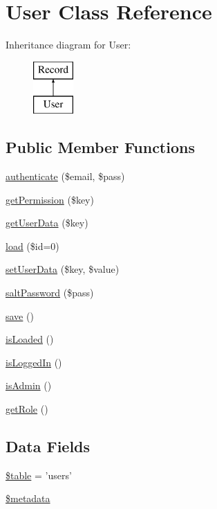 \hypertarget{class_user}{\section{User Class Reference}
\label{class_user}
}
Inheritance diagram for User\-:\begin{figure}[H]
\begin{center}
\leavevmode
\includegraphics[height=2.000000cm]{class_user}
\end{center}
\end{figure}
\subsection*{Public Member Functions}
\begin{DoxyCompactItemize}
\item 
\hyperlink{class_user_a1e96415be573b36d4160d6ed1f6f40d3}{authenticate} (\$email, \$pass)
\item 
\hyperlink{class_user_a610dd05d53d99e1ddc05596468eb4914}{get\-Permission} (\$key)
\item 
\hyperlink{class_user_ab62d4b3c3a14ab592768235dad6deb63}{get\-User\-Data} (\$key)
\item 
\hyperlink{class_user_a7160b09d9d37ede69811a66dc9e4f272}{load} (\$id=0)
\item 
\hyperlink{class_user_a96f600de7f4fe416bf8565d9d0eebee4}{set\-User\-Data} (\$key, \$value)
\item 
\hyperlink{class_user_a8cdc6b049e470fac0e97101e4f353a05}{salt\-Password} (\$pass)
\item 
\hyperlink{class_user_afc8a3c62679cf00ade9f15fb2a6d6132}{save} ()
\item 
\hyperlink{class_user_a2f27c20674620565aa8b3433bffe305d}{is\-Loaded} ()
\item 
\hyperlink{class_user_a33bdd79e5da367ebddd4cfbdbbfc7cff}{is\-Logged\-In} ()
\item 
\hyperlink{class_user_aabf23b66cd362adaa508de5bfb22706a}{is\-Admin} ()
\item 
\hyperlink{class_user_a0b2e7098f1c48a7439a42bada5b69689}{get\-Role} ()
\end{DoxyCompactItemize}
\subsection*{Data Fields}
\begin{DoxyCompactItemize}
\item 
\hyperlink{class_user_ae8876a14058f368335baccf35af4a22b}{\$table} = 'users'
\item 
\hyperlink{class_user_ae7fc3682b173ad9d4b1892bdc04d18d9}{\$metadata}
\end{DoxyCompactItemize}
